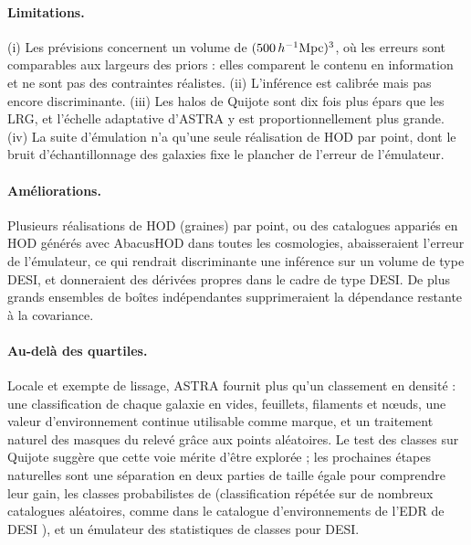 \paragraph{Limitations.} (i) Les prévisions concernent un volume de $(500\,h^{-1}\mathrm{Mpc})^3$, où les erreurs sont comparables aux largeurs des priors : elles comparent le contenu en information et ne sont pas des contraintes réalistes. (ii) L'inférence est calibrée mais pas encore discriminante. (iii) Les halos de Quijote sont dix fois plus épars que les LRG, et l'échelle adaptative d'ASTRA y est proportionnellement plus grande. (iv) La suite d'émulation n'a qu'une seule réalisation de HOD par point, dont le bruit d'échantillonnage des galaxies fixe le plancher de l'erreur de l'émulateur.

\paragraph{Améliorations.} Plusieurs réalisations de HOD (graines) par point, ou des catalogues appariés en HOD générés avec AbacusHOD dans toutes les cosmologies, abaisseraient l'erreur de l'émulateur, ce qui rendrait discriminante une inférence sur un volume de type DESI, et donneraient des dérivées propres dans le cadre de type DESI. De plus grands ensembles de boîtes indépendantes supprimeraient la dépendance restante à la covariance.

\paragraph{Au-delà des quartiles.} Locale et exempte de lissage, ASTRA fournit plus qu'un classement en densité : une classification de chaque galaxie en vides, feuillets, filaments et nœuds, une valeur d'environnement continue utilisable comme marque, et un traitement naturel des masques du relevé grâce aux points aléatoires. Le test des classes sur Quijote suggère que cette voie mérite d'être explorée ; les prochaines étapes naturelles sont une séparation en deux parties de taille égale pour comprendre leur gain, les classes probabilistes de \cite{ASTRA} (classification répétée sur de nombreux catalogues aléatoires, comme dans le catalogue d'environnements de l'EDR de DESI \cite{ZapataZuluaga2026}), et un émulateur des statistiques de classes pour DESI.
